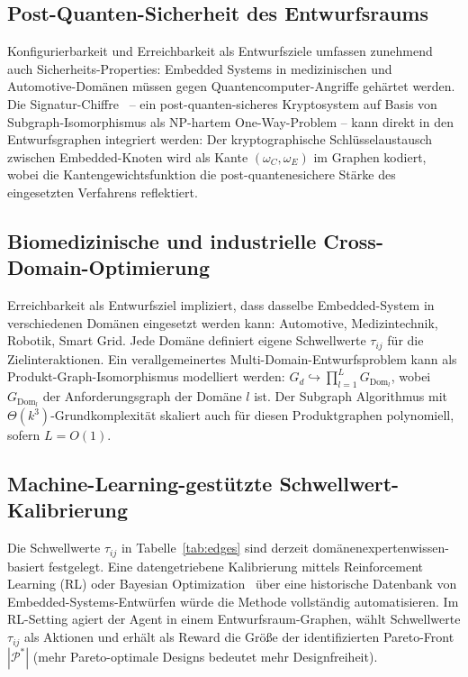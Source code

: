 ﻿\documentclass[a4paper,12pt]{article}
\theoremstyle{definition}
\begin{document}
\subsection{Post-Quanten-Sicherheit des Entwurfsraums}

Konfigurierbarkeit und Erreichbarkeit als Entwurfsziele umfassen zunehmend
auch Sicherheits-Properties: Embedded Systems in medizinischen und
Automotive-Dom\"{a}nen m\"{u}ssen gegen Quantencomputer-Angriffe geh\"{a}rtet werden.
Die Signatur-Chiffre~\cite{epp2026signatur} -- ein post-quanten-sicheres
Kryptosystem auf Basis von Subgraph-Isomorphismus als NP-hartem
One-Way-Problem -- kann direkt in den Entwurfsgraphen integriert werden:
Der kryptographische Schl\"{u}sselaustausch zwischen Embedded-Knoten wird als
Kante $(\omega_C, \omega_E)$ im Graphen kodiert, wobei die
Kantengewichtsfunktion die post-quantenesichere St\"{a}rke des eingesetzten
Verfahrens reflektiert.

\subsection{Biomedizinische und industrielle Cross-Domain-Optimierung}

Erreichbarkeit als Entwurfsziel impliziert, dass dasselbe Embedded-System
in verschiedenen Dom\"{a}nen eingesetzt werden kann: Automotive, Medizintechnik,
Robotik, Smart Grid.
Jede Dom\"{a}ne definiert eigene Schwellwerte $\tau_{ij}$ f\"{u}r die
Zielinteraktionen. Ein verallgemeinertes Multi-Domain-Entwurfsproblem kann
als Produkt-Graph-Isomorphismus modelliert werden:
$G_d \hookrightarrow \prod_{l=1}^{L} G_{\mathrm{Dom}_l}$,
wobei $G_{\mathrm{Dom}_l}$ der Anforderungsgraph der Dom\"{a}ne $l$ ist.
Der Subgraph Algorithmus mit $\Theta(k^3)$-Grundkomplexit\"{a}t skaliert auch
f\"{u}r diesen Produktgraphen polynomiell, sofern $L = O(1)$.

\subsection{Machine-Learning-gest\"{u}tzte Schwellwert-Kalibrierung}

Die Schwellwerte $\tau_{ij}$ in Tabelle~\ref{tab:edges} sind derzeit
dom\"{a}nenexpertenwissen-basiert festgelegt.
Eine datengetriebene Kalibrierung mittels Reinforcement Learning (RL)
oder Bayesian Optimization~\cite{shahriari2016taking} \"{u}ber eine historische
Datenbank von Embedded-Systems-Entw\"{u}rfen w\"{u}rde die Methode
vollst\"{a}ndig automatisieren.
Im RL-Setting agiert der Agent in einem Entwurfsraum-Graphen, w\"{a}hlt
Schwellwerte $\tau_{ij}$ als Aktionen und erh\"{a}lt als Reward die Gr\"{o}{\ss}e der
identifizierten Pareto-Front $|\mathcal{P}^*|$ (mehr Pareto-optimale
Designs bedeutet mehr Designfreiheit).
\end{document}
